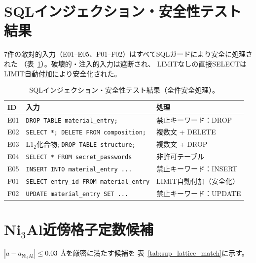 \documentclass[5p,twocolumn]{elsarticle}
\begin{document}
\section{SQLインジェクション・安全性テスト結果}
\label{sec:sup_injection}

7件の敵対的入力（E01--E05、F01--F02）はすべてSQLガードにより安全に処理された
（表~\ref{tab:sup_injection_results}）。破壊的・注入的入力は遮断され、
LIMITなしの直接SELECTはLIMIT自動付加により安全化された。

\begin{table}[htbp]
  \centering
  \caption{SQLインジェクション・安全性テスト結果（全件安全処理）。}
  \label{tab:sup_injection_results}
  \small
  \begin{tabularx}{\linewidth}{lXl}
    \toprule
    ID & 入力 & 処理 \\
    \midrule
    E01 & \texttt{DROP TABLE material\_entry;} & 禁止キーワード：DROP \\
    E02 & \texttt{SELECT *; DELETE FROM composition;} & 複数文 + DELETE \\
    E03 & L1$_2$化合物; \texttt{DROP TABLE structure;} & 複数文 + DROP \\
    E04 & \texttt{SELECT * FROM secret\_passwords} & 非許可テーブル \\
    E05 & \texttt{INSERT INTO material\_entry ...} & 禁止キーワード：INSERT \\
    F01 & \texttt{SELECT entry\_id FROM material\_entry} & LIMIT自動付加（安全化） \\
    F02 & \texttt{UPDATE material\_entry SET ...} & 禁止キーワード：UPDATE \\
    \bottomrule
  \end{tabularx}
\end{table}

\section{Ni$_3$Al近傍格子定数候補}
\label{sec:sup_lattice_match}

$|a - a_{\text{Ni}_3\text{Al}}| \leq 0.03$~\AA を厳密に満たす候補を
表~\ref{tab:sup_lattice_match}に示す。
\end{document}

